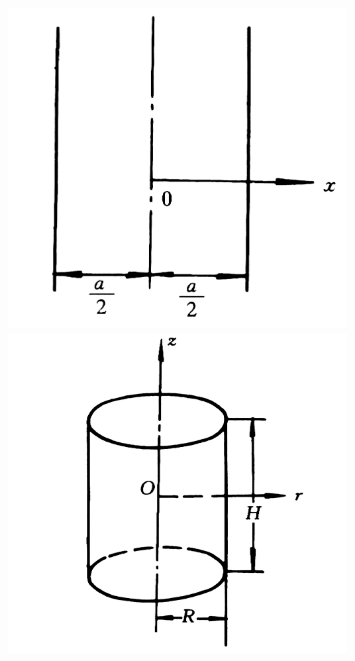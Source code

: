 \documentclass{Sichuan Normal University}
\begin{document}
\begin{figure}[H]
    \centering
    \begin{minipage}[c]{0.48\textwidth}
    \centering
    \includegraphics[width=0.8\textwidth]{./figure/无限平板形反应堆.png}
    \end{minipage}
    \hspace{0.02\textwidth}
    \begin{minipage}[c]{0.48\textwidth}
    \centering
    \includegraphics[width=0.8\textwidth]{./figure/圆柱体反应堆.png}
    \end{minipage}\\[3mm]
    \begin{minipage}[t]{0.48\textwidth}
    \centering
    \label{fig:无限平板形反应堆}
    \end{minipage}
    \hspace{0.02\textwidth}
    \begin{minipage}[t]{0.48\textwidth}
    \centering
    \label{fig:圆柱体反应堆}
    \end{minipage}
    \end{figure}
\end{document}
